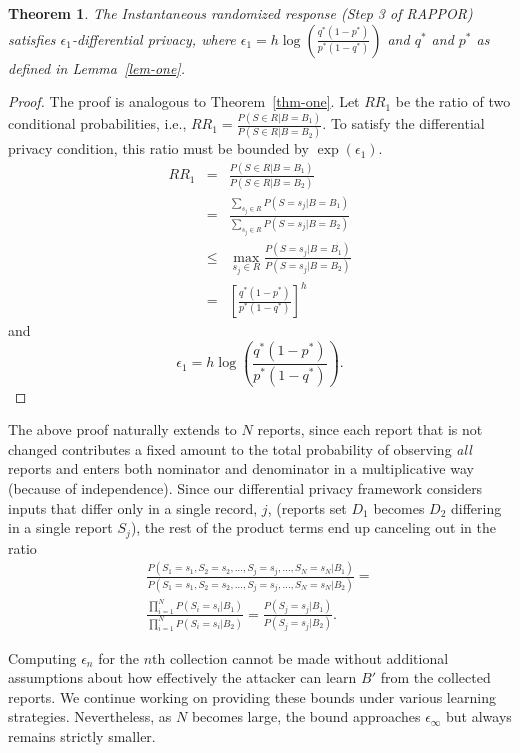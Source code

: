 \documentclass{sig-alternate-2013}
\newtheorem{theorem}{Theorem}
\newcommand\RAPPOR{{RAPPOR}}
\begin{document}
\begin{theorem}
The Instantaneous randomized response (Step 3 of \RAPPOR{}) satisfies $\epsilon_1$-differential privacy, where $\epsilon_1 = h\log\left(\frac{q^*(1 - p^*)}{p^*(1 - q^*)}\right)$ and $q^*$ and $p^*$ as defined in Lemma~\ref{lem-one}.
\end{theorem}

\begin{proof}
The proof is analogous to Theorem~\ref{thm-one}. Let $RR_1$ be the ratio of two conditional probabilities, i.e., $RR_1 = \frac{P(S \in R | B = B_1)}{P(S \in R | B = B_2)}$. To satisfy the differential privacy condition, this ratio must be bounded by $\exp(\epsilon_1)$.
\begin{eqnarray*}
RR_1 &=& \frac{P(S \in R | B = B_1)}{P(S \in R | B = B_2)} \\
   &=& \frac{\sum_{s_j \in R}P(S = s_j | B = B_1)}{\sum_{s_j \in R}P(S = s_j | B = B_2)} \\
   &\le& \max_{s_j \in R} \frac{P(S= s_j | B = B_1)}{P(S = s_j | B = B_2)} \\
   &=& \left[\frac{q^*(1 - p^*)}{p^*(1 - q^*)}\right]^h
\end{eqnarray*}
and
$$
\epsilon_1 = h\log\left(\frac{q^*(1 - p^*)}{p^*(1 - q^*)}\right).
$$\end{proof}

The above proof naturally extends to $N$ reports, since each report that is not changed contributes a fixed amount to the total probability of observing \emph{all} reports and enters both nominator and denominator in a multiplicative way (because of independence). Since our differential privacy framework considers inputs that differ only in a single record, $j$, (reports set $D_1$ becomes $D_2$ differing in a single report $S_j$), the rest of the product terms end up canceling out in the ratio
\begin{eqnarray*}
\frac{P(S_1 = s_1, S_2 = s_2, \ldots, S_j = s_j, \ldots, S_N = s_N | B_1)}{P(S_1 = s_1, S_2 = s_2, \ldots, S_j = s_j, \ldots, S_N = s_N | B_2)}  =\\
   \frac{\prod_{i=1}^N P(S_i = s_i | B_1)}{\prod_{i=1}^N P(S_i = s_i | B_2)} = \frac{P(S_j = s_j | B_1)}{P(S_j = s_j | B_2)}.
\end{eqnarray*}

Computing $\epsilon_n$ for the $n$th collection cannot be made without additional assumptions about how effectively the attacker can learn $B'$ from the collected reports. We continue working on providing these bounds under various learning strategies. Nevertheless, as $N$ becomes large, the bound approaches $\epsilon_{\infty}$ but always remains strictly smaller.
\end{document}
